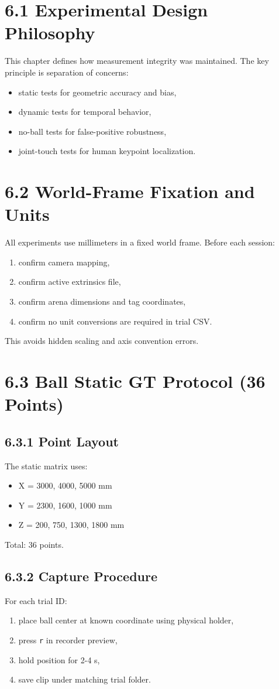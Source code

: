 \section{6.1 Experimental Design Philosophy}
This chapter defines how measurement integrity was maintained. The key principle is separation of concerns:
\begin{itemize}
  \item static tests for geometric accuracy and bias,
  \item dynamic tests for temporal behavior,
  \item no-ball tests for false-positive robustness,
  \item joint-touch tests for human keypoint localization.
\end{itemize}

\section{6.2 World-Frame Fixation and Units}
All experiments use millimeters in a fixed world frame. Before each session:
\begin{enumerate}
  \item confirm camera mapping,
  \item confirm active extrinsics file,
  \item confirm arena dimensions and tag coordinates,
  \item confirm no unit conversions are required in trial CSV.
\end{enumerate}

This avoids hidden scaling and axis convention errors.

\section{6.3 Ball Static GT Protocol (36 Points)}
\subsection{6.3.1 Point Layout}
The static matrix uses:
\begin{itemize}
  \item X = 3000, 4000, 5000 mm
  \item Y = 2300, 1600, 1000 mm
  \item Z = 200, 750, 1300, 1800 mm
\end{itemize}

Total: 36 points.

\subsection{6.3.2 Capture Procedure}
For each trial ID:
\begin{enumerate}
  \item place ball center at known coordinate using physical holder,
  \item press \texttt{r} in recorder preview,
  \item hold position for 2-4 s,
  \item save clip under matching trial folder.
\end{enumerate}

